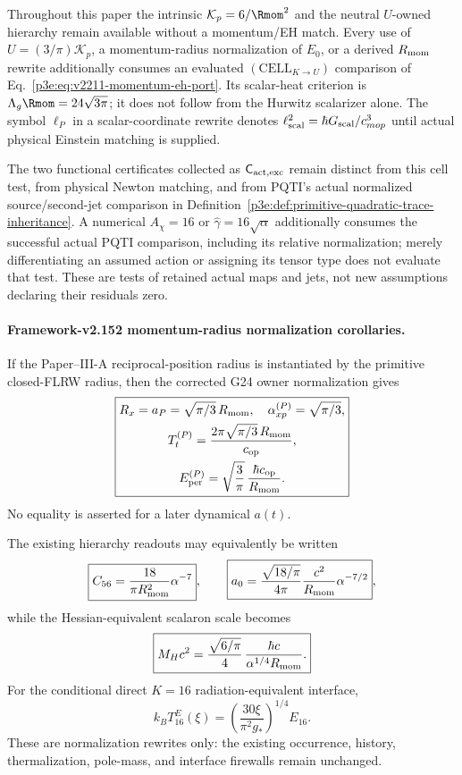\documentclass[12pt,a4paper]{article}
\begin{document}
\begin{remark}
\label{p8:rem:v2211-cell-pqti-scope}
Throughout this paper the intrinsic $\mathcal K_p=6/\Rmom^2$ and the
neutral $U$-owned hierarchy remain available without a momentum/EH match.
Every use of $U=(3/\pi)\mathcal K_p$, a momentum-radius normalization of
$E_0$, or a derived $R_{\rm mom}$ rewrite additionally consumes an evaluated
$(\mathrm{CELL}_{K\to U})$ comparison of
Eq.~\eqref{p3e:eq:v2211-momentum-eh-port}. Its scalar-heat criterion is
$\Lambda_g\Rmom=24\sqrt{3\pi}$; it does not follow from the Hurwitz
scalarizer alone. The symbol $\ell_P$ in a scalar-coordinate rewrite denotes
$\ell_{\rm scal}^2=\hbar G_{\rm scal}/c_{
m op}^3$ until actual physical
Einstein matching is supplied.

The two functional certificates collected as $\mathsf C_{\rm act,exc}$
remain distinct from this cell test, from physical Newton matching, and from
PQTI's actual normalized source/second-jet comparison in
Definition~\ref{p3e:def:primitive-quadratic-trace-inheritance}. A numerical
$A_\chi=16$ or $\widehat\gamma=16\sqrt\alpha$ additionally consumes the
successful actual PQTI comparison, including its relative normalization;
merely differentiating an assumed action or assigning its tensor type does
not evaluate that test. These are tests of retained actual maps and jets,
not new assumptions declaring their residuals zero.
\end{remark}

\paragraph{Framework-v2.152 momentum-radius normalization corollaries.}
If the Paper--III-A reciprocal-position radius is instantiated by the
primitive closed-FLRW radius, then the corrected G24 owner normalization gives
\[
 \boxed{\begin{gathered}
 R_x=a_P=\sqrt{\pi/3}\,R_{\rm mom},\quad \alpha_{xp}^{(P)}=\sqrt{\pi/3},\\
 T_t^{(P)}=\frac{2\pi\sqrt{\pi/3}\,R_{\rm mom}}{c_{\rm op}},\\
 E_{\rm per}^{(P)}=\sqrt{\frac3\pi}\,\frac{\hbar c_{\rm op}}{R_{\rm mom}}.
 \end{gathered}}
\]
No equality is asserted for a later dynamical \(a(t)\).

The existing hierarchy readouts may equivalently be written
\[
 \boxed{C_{56}=\frac{18}{\pi R_{\rm mom}^2}\alpha^{-7}},\qquad
 \boxed{a_0=\frac{\sqrt{18/\pi}}{4\pi}\frac{c^2}{R_{\rm mom}}\alpha^{-7/2}},
\]
while the Hessian-equivalent scalaron scale becomes
\[
 \boxed{M_Hc^2=\frac{\sqrt{6/\pi}}{4}\,\frac{\hbar c}{\alpha^{1/4}R_{\rm mom}}.}
\]
For the conditional direct \(K=16\) radiation-equivalent interface,
\[
 \boxed{k_BT_{16}^{E}(\xi)=
 \left(\frac{30\xi}{\pi^2g_*}\right)^{1/4}E_{16}.}
\]
These are normalization rewrites only: the existing occurrence, history,
thermalization, pole-mass, and interface firewalls remain unchanged.
\end{document}
